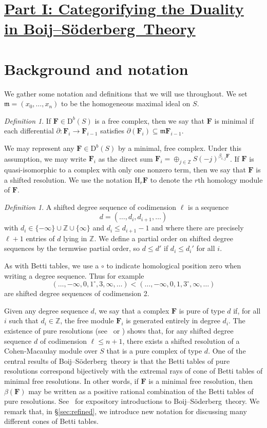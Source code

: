 \documentclass[12pt]{amsart}
\theoremstyle{definition}
\theoremstyle{remark}
\newtheorem{defn}[lemma]{Definition}
\newcommand{\HH}{\mathrm{H}}
\newcommand{\ZZ}{\mathbb{Z}}
\newcommand{\dd}{d}
\newcommand{\FF}{\mathbf{F}}
\newcommand{\defi}[1]{\textsf{#1}} %
\newcommand{\zp}{\circ}
\newcommand{\DD}{\mathrm{D}}
\def\BS{Boij--S\"oderberg~}
\begin{document}
\section*{\underline{{Part I: Categorifying the Duality in \BS Theory}}}
\section{Background and notation}\label{sec:notation}
We gather some notation and definitions that we will use throughout.  We set $\mathfrak m=(x_0, \dots, x_n)$ to be the homogeneous maximal ideal on $S$.
\begin{defn}
If $\FF\in \DD^b(S)$ is a free complex, then we say that $\FF$ is \defi{minimal} if each differential $\partial: \FF_i\to \FF_{i-1}$ satisfies $\partial(\FF_i)\subseteq \mathfrak m\FF_{i-1}$.
\end{defn}
We may represent any $\FF\in \DD^b(S)$ by a minimal, free complex.  Under this assumption, we may write $\FF_i$ as the direct sum $\FF_i=\oplus_{j\in \ZZ} S(-j)^{\beta_{i,j}\FF}$.  If $\FF$ is quasi-isomorphic to a complex with only one nonzero term, then we say that $\FF$ is a \defi{shifted resolution}.  We use the notation $\HH_r\FF$ to denote the $r$th homology module of $\FF$.

\begin{defn}
A \defi{shifted degree sequence of codimension $\ell$} is a sequence
\[{\dd}=(\dots, d_i, d_{i+1}, \dots)
\]
with  $d_{i} \in \{-\infty\}\cup \ZZ\cup \{\infty\}$ and $d_i \leq d_{i+1}-1$ and 
where there are precisely $\ell+1$ entries of $\dd$ lying in $\ZZ$. 
We define a partial order on shifted degree sequences by the termwise partial order, so $d\leq d'$ if $d_i\leq d_i'$ for all $i$.
\end{defn}
As with Betti tables, we use a $\zp$ to indicate homological position zero when writing a degree sequence. 
Thus for example
$$
(\dots, -\infty , 0, 1^{\circ}, 3, \infty, \dots) < (\dots, -\infty , 0, 1, 3^{\circ}, \infty, \dots) 
$$
are shifted degree sequences of codimension 2.

Given any degree sequence $\dd$, we say that a complex $\FF$ is \defi{pure of type $\dd$} if, for all $i$ such that $d_i\in \ZZ$, the free module $\FF_i$ is generated entirely in degree $d_i$.   The existence of pure resolutions (see~\cite{efw} or \cite[\S5]{eis-schrey1}) shows that, for any shifted degree sequence $\dd$ of codimension $\ell\leq n+1$, there exists a shifted resolution of a Cohen-Macaulay module over $S$ that is a pure complex of type $\dd$.  One of the central results of \BS theory is that the Betti tables of pure resolutions correspond bijectively with the extremal rays of cone of Betti tables of minimal free resolutions.  In other words, if $\FF$ is a minimal free resolution, then $\beta(\FF)$ may be written as a positive rational combination of the Betti tables of pure resolutions.  See~\cites{eis-schrey-icm,floystad-expository} for expository introductions to \BS theory.  We remark that, in \S\ref{sec:refined}, we introduce new notation for discussing many different cones of Betti tables.
\end{document}
